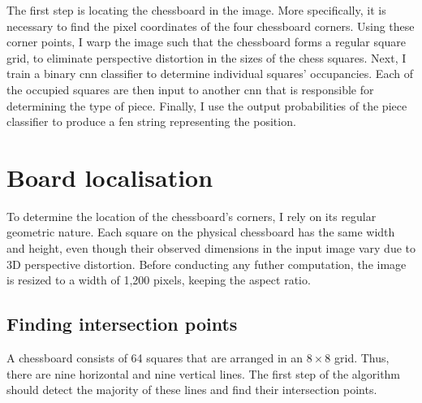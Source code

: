 \documentclass[../report.tex]{subfiles}
\begin{document}
The first step is locating the chessboard in the image.
More specifically, it is necessary to find the pixel coordinates of the four chessboard corners. 
Using these corner points, I warp the image such that the chessboard forms a regular square grid, to eliminate perspective distortion in the sizes of the chess squares.
Next, I train a binary \gls{cnn} classifier to determine individual squares' occupancies.
Each of the occupied squares are then input to another \gls{cnn} that is responsible for determining the type of piece. 
Finally, I use the output probabilities of the piece classifier to produce a \gls{fen} string representing the position. 


\section{Board localisation}
\label{sec:board_localisation}
To determine the location of the chessboard's corners, I rely on its regular geometric nature. 
Each square on the physical chessboard has the same width and height, even though their observed dimensions in the input image vary due to 3D perspective distortion.
Before conducting any futher computation, the image is resized to a width of 1,200 pixels, keeping the aspect ratio.

\subsection{Finding intersection points}
\label{sec:find_intersection_points}
A chessboard consists of 64 squares that are arranged in an $8\times 8$ grid.
Thus, there are nine horizontal and nine vertical lines.
The first step of the algorithm should detect the majority of these lines and find their intersection points.
\end{document}
